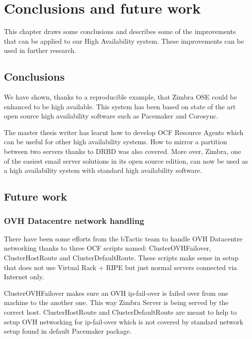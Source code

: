 

\chapter{Conclusions and future work}
\label{chap:conclusions-and-future-work}
This chapter draws some conclusions and describes some of the improvements that can be applied to our High Availability system. These improvements can be used in further research.

\section {Conclusions}

We have shown, thanks to a reproducible example, that Zimbra OSE could be enhanced to be high available. This system has been based on state of the art open source high availability software such as Pacemaker and Corosync.

The master thesis writer has learnt how to develop OCF Resource Agents which can be useful for other high availability systems. How to mirror a partition between two servers thanks to DRBD was also covered. More over, Zimbra, one of the easiest email server solutions in its open source edition, can now be used as a high availability system with standard high availability software.

\section {Future work}

\subsection {OVH Datacentre network handling}
There have been some efforts from the bTactic team to handle OVH Datacentre networking thanks to three OCF scripts named: 
ClusterOVHFailover, ClusterHostRoute and ClusterDefaultRoute. These scripts make sense in setup that does not use Virtual Rack + RIPE but just normal servers connected via Internet only.

ClusterOVHFailover makes sure an OVH ip-fail-over is failed over from one machine to the another one. This way Zimbra Server is being served by the correct host.
ClusterHostRoute and ClusterDefaultRoute are meant to help to setup OVH networking for ip-fail-over which is not covered by standard network setup found in  default Pacemaker package.

